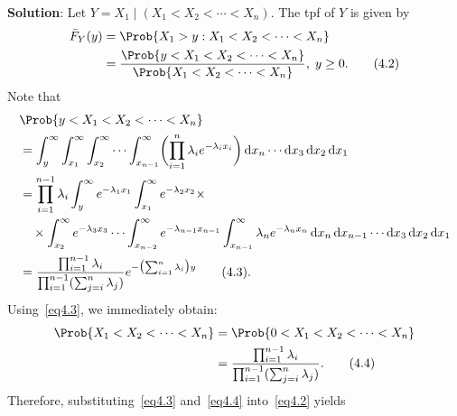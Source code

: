 \begin{Example}
\begin{enumerate}[(a)]
              \textbf{Solution}: Let $ Y=X_1\mid(X_1<X_2<\cdots<X_n) $. The tpf of $ Y $ is given by
              \begin{align*}
                  \bar{F}_Y(y)
                   & =\Prob{X_1>y\given X_1<X_2<\cdots<X_n}                                                             \\
                   & =\frac{\Prob{y<X_1<X_2<\cdots<X_n}}{\Prob{X_1<X_2<\cdots<X_n}},\; y\ge 0.\tag*{(4.2)}\label{eq4.2}
              \end{align*}
              Note that
              \begin{align*}
                   & \Prob{y<X_1<X_2<\cdots<X_n}                                                                                                                                                                                           \\
                   & =\int_{y}^{\infty}\int_{x_1}^{\infty}\int_{x_2}^{\infty}\cdots \int_{x_{n-1}}^{\infty}\biggl(\prod_{i=1}^n \lambda_i e^{-\lambda_i x_i}\biggr)\odif{x_n}\cdots\odif{x_3}\odif{x_2}\odif{x_1}                          \\
                   & = \prod_{i=1}^{n-1}\lambda_i\int_{y}^{\infty}e^{-\lambda_1x_1}\int_{x_1}^{\infty}e^{-\lambda_2x_2}\times                                                                                                              \\
                   & \quad\times\int_{x_2}^{\infty}e^{-\lambda_3x_3}\cdots \int_{x_{n-2}}^{\infty}e^{-\lambda_{n-1}x_{n-1}}\int_{x_{n-1}}^{\infty}\lambda_n e^{-\lambda_n x_n}\odif{x_n}\odif{x_{n-1}}\cdots\odif{x_3}\odif{x_2}\odif{x_1} \\
                   & =\frac{\prod_{i=1}^{n-1}\lambda_i}{\prod_{i=1}^{n-1}(\sum_{j=i}^{n}\lambda_j)}e^{-\bigl(\sum_{i=1}^{n}\lambda_i\bigr)y}\tag*{(4.3)}\label{eq4.3}.
              \end{align*}
              Using~\ref{eq4.3}, we immediately obtain:
              \begin{align*}
                  \Prob{X_1<X_2<\cdots<X_n}
                   & =\Prob{0<X_1<X_2<\cdots<X_n}                                                                             \\
                   & =\frac{\prod_{i=1}^{n-1}\lambda_i}{\prod_{i=1}^{n-1}(\sum_{j=i}^{n}\lambda_j)}.\tag*{(4.4)}\label{eq4.4}
              \end{align*}
              Therefore, substituting~\ref{eq4.3} and~\ref{eq4.4} into~\ref{eq4.2} yields

\end{enumerate}
\end{Example}
